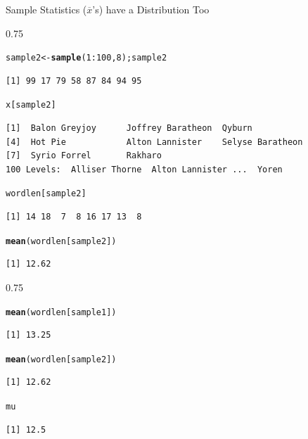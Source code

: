 \documentclass{beamer}\usepackage[]{graphicx}\usepackage[]{color}
\makeatletter
\newcommand{\hlnum}[1]{\textcolor[rgb]{0.2,0.2,0.2}{#1}}%
\newcommand{\hlopt}[1]{\textcolor[rgb]{0.102,0.102,0.102}{#1}}%
\newcommand{\hlstd}[1]{\textcolor[rgb]{0.102,0.102,0.102}{#1}}%
\newcommand{\hlkwb}[1]{\textcolor[rgb]{0.102,0.102,0.102}{#1}}%
\newcommand{\hlkwd}[1]{\textcolor[rgb]{0.102,0.102,0.102}{\textbf{#1}}}%
\newenvironment{kframe}{%
 \def\at@end@of@kframe{}%
 \ifinner\ifhmode%
  \def\at@end@of@kframe{\end{minipage}}%
  \begin{minipage}{\columnwidth}%
 \fi\fi%
 \def\FrameCommand##1{\hskip\@totalleftmargin \hskip-\fboxsep
 \colorbox{shadecolor}{##1}\hskip-\fboxsep
     \hskip-\linewidth \hskip-\@totalleftmargin \hskip\columnwidth}%
 \MakeFramed {\advance\hsize-\width
   \@totalleftmargin\z@ \linewidth\hsize
   \@setminipage}}%
 {\par\unskip\endMakeFramed%
 \at@end@of@kframe}
\newenvironment{knitrout}{}{} %
\renewenvironment{knitrout}{\begin{spacing}{0.75}\begin{tiny}}{\end{tiny}\end{spacing}}
\newcommand{\xbar}{\overline{x}}
\makeatother
\begin{document}
\begin{frame}{Sample Statistics ($\xbar$'s) have a Distribution Too\;\;}
\begin{knitrout}\small
{}\color{fgcolor}\begin{kframe}
\begin{alltt}
\hlstd{sample2} \hlkwb{<-} \hlkwd{sample}\hlstd{(}\hlnum{1}\hlopt{:}\hlnum{100}\hlstd{,}\hlnum{8}\hlstd{);   sample2}
\end{alltt}
\begin{verbatim}
[1] 99 17 79 58 87 84 94 95
\end{verbatim}
\begin{alltt}
\hlstd{x[sample2]}
\end{alltt}
\begin{verbatim}
[1]  Balon Greyjoy      Joffrey Baratheon  Qyburn           
[4]  Hot Pie            Alton Lannister    Selyse Baratheon 
[7]  Syrio Forrel       Rakharo          
100 Levels:  Alliser Thorne  Alton Lannister ...  Yoren
\end{verbatim}
\begin{alltt}
\hlstd{wordlen[sample2]}
\end{alltt}
\begin{verbatim}
[1] 14 18  7  8 16 17 13  8
\end{verbatim}
\begin{alltt}
\hlkwd{mean}\hlstd{(wordlen[sample2])}
\end{alltt}
\begin{verbatim}
[1] 12.62
\end{verbatim}
\end{kframe}
\end{knitrout}

\newpage

\begin{knitrout}\small
{}\color{fgcolor}\begin{kframe}
\begin{alltt}
\hlkwd{mean}\hlstd{(wordlen[sample1])}
\end{alltt}
\begin{verbatim}
[1] 13.25
\end{verbatim}
\begin{alltt}
\hlkwd{mean}\hlstd{(wordlen[sample2])}
\end{alltt}
\begin{verbatim}
[1] 12.62
\end{verbatim}
\begin{alltt}
\hlstd{mu}
\end{alltt}
\begin{verbatim}
[1] 12.5
\end{verbatim}
\end{kframe}
\end{knitrout}


\end{frame}
\end{document}
